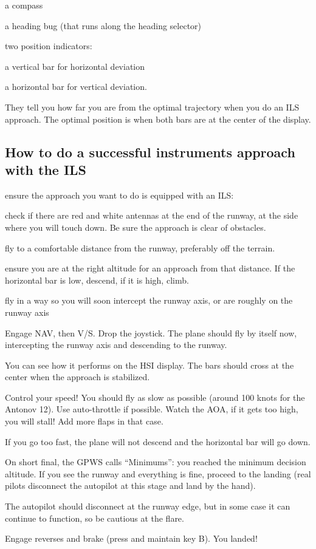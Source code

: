a compass

a heading bug (that runs along the heading selector)

two position indicators:

a vertical bar for horizontal deviation

a horizontal bar for vertical deviation.

They tell you how far you are from the optimal trajectory when you do an
ILS approach. The optimal position is when both bars are at the center
of the display.

\hypertarget{how-to-do-a-successful-instruments-approach-with-the-ils}{%
\subsection{How to do a successful instruments approach with the
ILS}\label{how-to-do-a-successful-instruments-approach-with-the-ils}}

ensure the approach you want to do is equipped with an ILS:

check if there are red and white antennas at the end of the runway, at
the side where you will touch down. Be sure the approach is clear of
obstacles.

fly to a comfortable distance from the runway, preferably off the
terrain.

ensure you are at the right altitude for an approach from that distance.
If the horizontal bar is low, descend, if it is high, climb.

fly in a way so you will soon intercept the runway axis, or are roughly
on the runway axis

Engage NAV, then V/S. Drop the joystick. The plane should fly by itself
now, intercepting the runway axis and descending to the runway.

You can see how it performs on the HSI display. The bars should cross at
the center when the approach is stabilized.

Control your speed! You should fly as slow as possible (around 100 knots
for the Antonov 12). Use auto-throttle if possible. Watch the AOA, if it
gets too high, you will stall! Add more flaps in that case.

If you go too fast, the plane will not descend and the horizontal bar
will go down.

On short final, the GPWS calls ``Minimums'': you reached the minimum
decision altitude. If you see the runway and everything is fine, proceed
to the landing (real pilots disconnect the autopilot at this stage and
land by the hand).

The autopilot should disconnect at the runway edge, but in some case it
can continue to function, so be cautious at the flare.

Engage reverses and brake (press and maintain key B). You landed!
